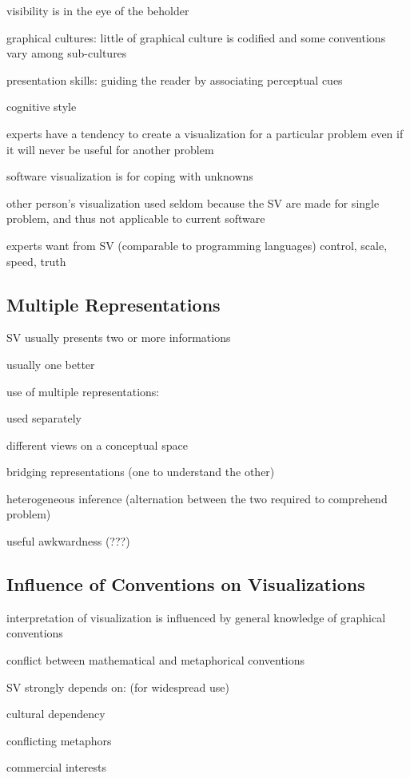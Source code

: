 \documentclass[11pt, a4paper, ngerman, twoside]{article}
\theoremstyle{plain}\newtheorem{Lemma}{Lemma}
\theoremstyle{plain}\newtheorem{Satz}[Lemma]{Satz}
\theoremstyle{definition}\newtheorem{Definition}[Lemma]{Definition}
\theoremstyle{definition}\newtheorem*{Beispiel}{Beispiel}
\theoremstyle{remark}\newtheorem*{Bemerkung}{Bemerkung}
\begin{document}
visibility is in the eye of the beholder

graphical cultures: little of graphical culture is codified and some conventions vary among sub-cultures

presentation skills: guiding the reader by associating perceptual cues

cognitive style

experts have a tendency to create a visualization for a particular problem even if it will never be useful for another problem

software visualization is for coping with unknowns

other person’s visualization used seldom because the SV are made for single problem, and thus not applicable to current software

experts want from SV (comparable to programming languages) control, scale, speed, truth

\subsection{Multiple Representations}

SV usually presents two or more informations

usually one better

use of multiple representations:

used separately

different views on a conceptual space

bridging representations (one to understand the other)

heterogeneous inference (alternation between the two required to comprehend problem)

useful awkwardness (???)

\subsection{Influence of Conventions on Visualizations}

interpretation of visualization is influenced by general knowledge of graphical conventions

conflict between mathematical and metaphorical conventions

SV strongly depends on: (for widespread use)

cultural dependency

conflicting metaphors

commercial interests
\end{document}
